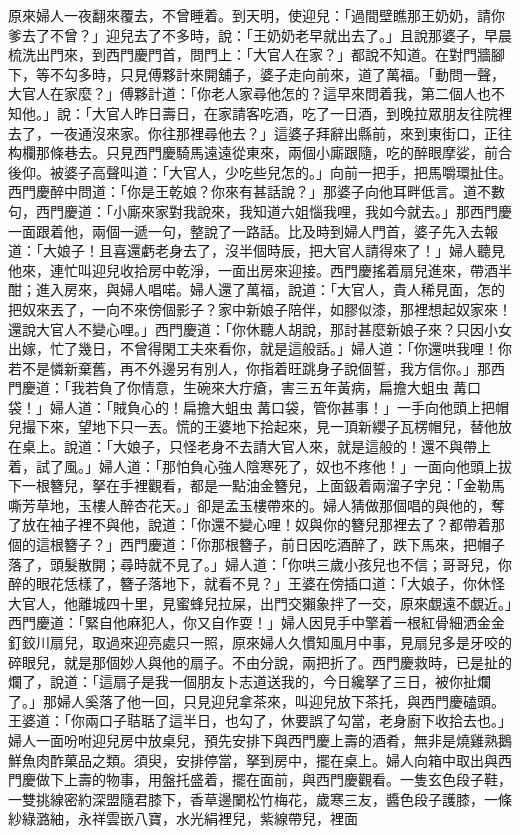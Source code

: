 \begin{showcontents}{}
原來婦人一夜翻來覆去，不曾睡着。到天明，使迎兒：「過間壁瞧那王奶奶，請你爹去了不曾？」迎兒去了不多時，說：「王奶奶老早就出去了。」且說那婆子，早晨梳洗出門來，到西門慶門首，問門上：「大官人在家？」都說不知道。在對門牆腳下，等不勾多時，只見傅夥計來開舖子，婆子走向前來，道了萬福。「動問一聲，大官人在家麼？」傅夥計道：「你老人家尋他怎的？這早來問着我，第二個人也不知他。」說：「大官人昨日壽日，在家請客吃酒，吃了一日酒，到晚拉眾朋友往院裡去了，一夜通沒來家。你往那裡尋他去？」這婆子拜辭出縣前，來到東街口，正往构欄那條巷去。只見西門慶騎馬遠遠從東來，兩個小廝跟隨，吃的醉眼摩娑，前合後仰。被婆子高聲叫道：「大官人，少吃些兒怎的。」向前一把手，把馬嚼環扯住。西門慶醉中問道：「你是王乾娘？你來有甚話說？」那婆子向他耳畔低言。道不數句，西門慶道：「小廝來家對我說來，我知道六姐惱我哩，我如今就去。」那西門慶一面跟着他，兩個一遞一句，整說了一路話。比及時到婦人門首，婆子先入去報道：「大娘子！且喜還虧老身去了，沒半個時辰，把大官人請得來了！」婦人聽見他來，連忙叫迎兒收拾房中乾淨，一面出房來迎接。西門慶搖着扇兒進來，帶酒半酣；進入房來，與婦人唱喏。婦人還了萬福，說道：「大官人，貴人稀見面，怎的把奴來丟了，一向不來傍個影子？家中新娘子陪伴，如膠似漆，那裡想起奴家來！還說大官人不變心哩。」西門慶道：「你休聽人胡說，那討甚麼新娘子來？只因小女出嫁，忙了幾日，不曾得閑工夫來看你，就是這般話。」婦人道：「你還哄我哩！你若不是憐新棄舊，再不外邊另有別人，你指着旺跳身子說個誓，我方信你。」那西門慶道：「我若負了你情意，生碗來大疔瘡，害三五年黃病，扁擔大蛆虫冓口袋！」婦人道：「賊負心的！扁擔大蛆虫冓口袋，管你甚事！」一手向他頭上把帽兒撮下來，望地下只一丟。慌的王婆地下拾起來，見一頂新纓子瓦楞帽兒，替他放在桌上。說道：「大娘子，只怪老身不去請大官人來，就是這般的！還不與帶上着，試了風。」婦人道：「那怕負心強人陰寒死了，奴也不疼他！」一面向他頭上拔下一根簪兒，拏在手裡觀看，都是一點油金簪兒，上面鈒着兩溜子字兒：「金勒馬嘶芳草地，玉樓人醉杏花天。」卻是孟玉樓帶來的。婦人猜做那個唱的與他的，奪了放在袖子裡不與他，說道：「你還不變心哩！奴與你的簪兒那裡去了？都帶着那個的這根簪子？」西門慶道：「你那根簪子，前日因吃酒醉了，跌下馬來，把帽子落了，頭髮散開；尋時就不見了。」婦人道：「你哄三歲小孩兒也不信；哥哥兒，你醉的眼花恁樣了，簪子落地下，就看不見？」王婆在傍插口道：「大娘子，你休怪大官人，他離城四十里，見蜜蜂兒拉屎，出門交獺象拌了一交，原來覷遠不覷近。」西門慶道：「緊自他麻犯人，你又自作耍！」婦人因見手中擎着一根紅骨細洒金金釘鉸川扇兒，取過來迎亮處只一照，原來婦人久慣知風月中事，見扇兒多是牙咬的碎眼兒，就是那個妙人與他的扇子。不由分說，兩把折了。西門慶救時，已是扯的爛了，說道：「這扇子是我一個朋友卜志道送我的，今日纔拏了三日，被你扯爛了。」那婦人奚落了他一回，只見迎兒拿茶來，叫迎兒放下茶托，與西門慶磕頭。王婆道：「你兩口子聐聒了這半日，也勾了，休要誤了勾當，老身廚下收拾去也。」婦人一面吩咐迎兒房中放桌兒，預先安排下與西門慶上壽的酒肴，無非是燒雞熟鵝鮮魚肉酢菓品之類。須臾，安排停當，拏到房中，擺在桌上。婦人向箱中取出與西門慶做下上壽的物事，用盤托盛着，擺在面前，與西門慶觀看。一隻玄色段子鞋，一雙挑線密約深盟隨君膝下，香草邊闌松竹梅花，歲寒三友，醬色段子護膝，一條紗綠潞紬，永祥雲嵌八寶，水光絹裡兒，紫線帶兒，裡面
\end{showcontents}
